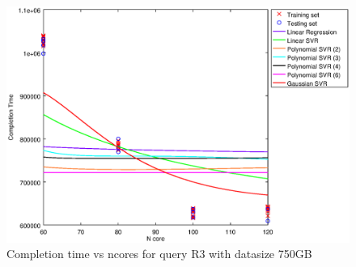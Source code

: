 
\begin {figure}[hbtp]
\centering
\includegraphics[width=\textwidth]{output/R3_750_1_OVER_NCORES/plot_R3_750.eps}
\caption{Completion time vs ncores for query R3 with datasize 750GB}
\label{fig:all_nonlinear_R3_750}
\end {figure}
